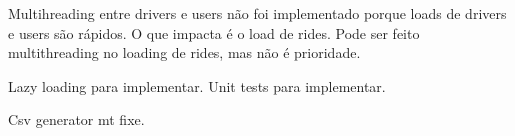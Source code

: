 Multihreading entre drivers e users não foi implementado porque loads de drivers e users são rápidos.
O que impacta é o load de rides.
Pode ser feito multithreading no loading de rides, mas não é prioridade.

Lazy loading para implementar.
Unit tests para implementar.

Csv generator mt fixe.